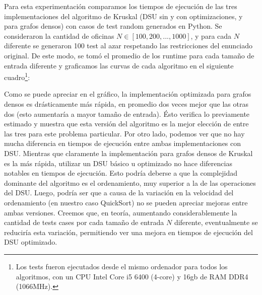 \vspace{1em}
Para esta experimentación comparamos los tiempos de ejecución de las tres implementaciones del algoritmo de Kruskal (DSU sin y con optimizaciones, y para grafos densos) con casos de test random generados en Python. Se consideraron la cantidad de oficinas $N \in [100, 200,..., 1000]$, y para cada $N$ diferente se generaron 100 test al azar respetando las restricciones del enunciado original. De este modo, se tomó el promedio de los runtime para cada tamaño de entrada diferente y graficamos las curvas de cada algoritmo en el siguiente cuadro\footnote{Los tests fueron ejecutados desde el mismo ordenador para todos los algoritmos, con un CPU Intel Core i5 6400 (4-core) y 16gb de RAM DDR4 (1066MHz).}:


\vspace{1em}
Como se puede apreciar en el gráfico, la implementación optimizada para grafos densos es drásticamente más rápida, en promedio dos veces mejor que las otras dos (esto aumentaría a mayor tamaño de entrada). Ésto verifica lo previamente estimado y muestra que esta versión del algoritmo es la mejor elección de entre las tres para este problema particular. Por otro lado, podemos ver que no hay mucha diferencia en tiempos de ejecución entre ambas implementaciones con DSU. Mientras que claramente la implementación para grafos densos de Kruskal es la más rápida, utilizar un DSU básico u optimizado no hace diferencias notables en tiempos de ejecución. Esto podría deberse a que la complejidad dominante del algoritmo es el ordenamiento, muy superior a la de las operaciones del DSU. Luego, podría ser que a causa de la variación en la velocidad del ordenamiento (en nuestro caso QuickSort) no se pueden apreciar mejoras entre ambas versiones. Creemos que, en teoría, aumentando considerablemente la cantidad de tests cases por cada tamaño de entrada $N$ diferente, eventualmente se reduciría esta variación, permitiendo ver una mejora en tiempos de ejecución del DSU optimizado. 